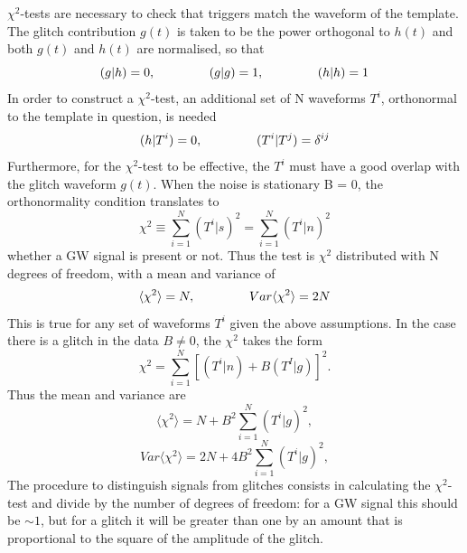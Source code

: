 \documentclass[binding=0.6cm, LaM]{sapthesis}
\begin{document}
	$\chi^2$-tests are necessary to check that triggers match the waveform of the template.
	The glitch contribution $g(t)$ is taken to be the power orthogonal to $h(t)$ 
	and both $g(t)$ and $h(t)$ are normalised, so that 
        \begin{equation}
          (g|h)=0, \hspace*{1.5cm} (g|g)=1, \hspace*{1.5cm} (h|h)=1
        \end{equation}
	In order to construct a $\chi^2$-test, an additional set of N waveforms $T^i$, 
	orthonormal to the template in question, is needed 
        \begin{equation}
          (h|T^i)=0,  \hspace*{1.5cm} (T^i|T^j)=\delta^{ij}
        \end{equation}
	Furthermore, for the $\chi^2$-test to be effective, 
	the $T^i$ must have a good overlap with the glitch waveform $g(t)$.
	When the noise is stationary B = 0, the orthonormality condition translates to 
        \begin{equation}
          \chi^2 \equiv \sum^N_{i=1}(T^i|s)^2 =\sum^{N}_{i=1}(T^i|n)^2
        \end{equation}
	whether a GW signal is present or not. 
	Thus the test is $\chi^2$ distributed with N degrees of freedom, 
	with a mean and variance of 
        \begin{equation}
          \langle \chi^2 \rangle = N, \hspace*{1.5cm} Var\langle \chi^2 \rangle=2N
        \end{equation}
	This is true for any set of waveforms $T^i$ given the above assumptions. 
	In the case there is a glitch in the data $B \neq 0$, the $\chi^2$ takes the form
        \begin{equation}
          \chi^2 =  \sum^N_{i=1}[(T^i|n) + B(T^I|g)]^2.
        \end{equation}
	Thus the mean and variance are 
        \begin{equation}
          \langle \chi^2 \rangle = N+ B^2\sum^N_{i=1}(T^i|g)^2, 
        \end{equation}
        \begin{equation}
          Var\langle \chi^2 \rangle=2N+ 4B^2\sum^N_{i=1}(T^i|g)^2, 
        \end{equation}
	The procedure to distinguish signals from glitches consists in calculating the $\chi^2$-test 
	and divide by the number of degrees of freedom: for a GW signal this should be $\sim 1$, 
	but for a glitch it will be greater than one by an amount that is proportional to the square of the amplitude of the glitch.
\end{document}

